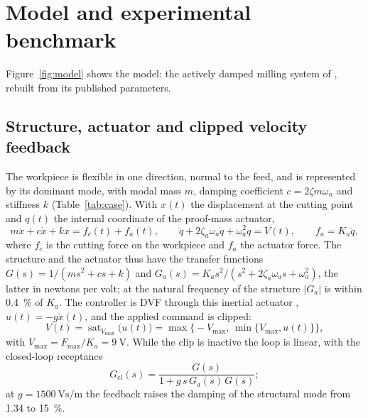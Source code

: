 \section{Model and experimental benchmark}\label{sec:model}

Figure~\ref{fig:model} shows the model: the actively damped milling system of \citet{ozsoy2026robust}, rebuilt from its published parameters.



\subsection{Structure, actuator and clipped velocity feedback}\label{sec:model-loop}

The workpiece is flexible in one direction, normal to the feed, and is represented by its dominant mode, with modal mass $m$, damping coefficient $c=2\zeta m\omega_n$ and stiffness $k$ (Table~\ref{tab:case}). With $x(t)$ the displacement at the cutting point and $q(t)$ the internal coordinate of the proof-mass actuator,
\begin{equation}\label{eq:eom}
  m\ddot x+c\dot x+kx=f_c(t)+f_a(t),\qquad
  \ddot q+2\zeta_a\omega_a\dot q+\omega_a^2q=V(t),\qquad
  f_a=K_a\ddot q ,
\end{equation}
where $f_c$ is the cutting force on the workpiece and $f_a$ the actuator force. The structure and the actuator thus have the transfer functions $G(s)=1/(ms^2+cs+k)$ and $G_a(s)=K_as^2/(s^2+2\zeta_a\omega_as+\omega_a^2)$, the latter in newtons per volt; at the natural frequency of the structure $\lvert G_a\rvert$ is within \SI{0.4}{\percent} of $K_a$. The controller is DVF through this inertial actuator \citep{elliott2001feedback}, $u(t)=-g\dot x(t)$, and the applied command is clipped:
\begin{equation}\label{eq:dvf}
  V(t)=\operatorname{sat}_{V_{\max}}\bigl(u(t)\bigr)=\max\bigl\{-V_{\max},\,\min\{V_{\max},u(t)\}\bigr\},
\end{equation}
with $V_{\max}=F_{\max}/K_a=\SI{9}{\volt}$. While the clip is inactive the loop is linear, with the closed-loop receptance
\begin{equation}\label{eq:Gcl}
  G_{\mathrm{cl}}(s)=\frac{G(s)}{1+g\,s\,G_a(s)\,G(s)} ;
\end{equation}
at $g=\SI{1500}{\volt\second\per\metre}$ the feedback raises the damping of the structural mode from 1.34 to \SI{15}{\percent}.


